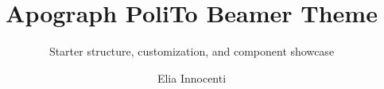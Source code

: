\documentclass[aspectratio=169]{beamer}
\title{Apograph PoliTo Beamer Theme}
\subtitle{Starter structure, customization, and component showcase}
\author{Elia Innocenti}
\begin{document}
\maketitle









\title{} %
\apographBackmatter
\end{document}
